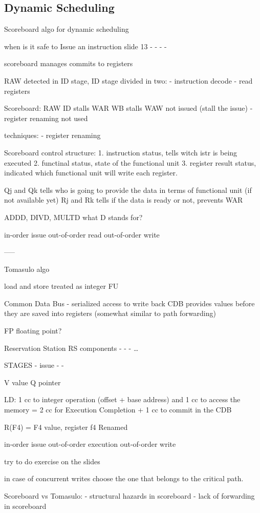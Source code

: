 
\subsection{Dynamic Scheduling}\label{subsec:dynamic-scheduling}

Scoreboard algo for dynamic scheduling

when is it safe to Issue an instruction slide 13
-
-
-
-

scoreboard manages commits to registers

RAW detected in ID stage, ID stage divided in two:
- instruction decode
- read registers

Scoreboard:
RAW ID stalls
WAR WB stalls
WAW not issued (stall the issue) - register renaming not used

techniques:
- register renaming

Scoreboard control structure:
1. instruction status, tells witch istr is being executed
2. functinal status, state of the functional unit
3. register result status, indicated which functional unit will write each register.

Qj and Qk tells who is going to provide the data in terms of functional unit (if not available yet)
Rj and Rk tells if the data is ready or not, prevents WAR

ADDD, DIVD, MULTD what D stands for?

in-order issue
out-of-order read
out-of-order write

-----

Tomasulo algo

load and store treated as integer FU

Common Data Bus - serialized access to write back
CDB provides values before they are saved into registers (somewhat similar to path forwarding)

FP floating point?

Reservation Station RS components
-
-
-
\ldots

STAGES
- issue
-
-

V value
Q pointer

LD: 1 cc to integer operation (offset + base address) and 1 cc to access the memory = 2 cc for Execution Completion + 1 cc to commit in the CDB

R(F4) = F4 value, register f4 Renamed

in-order issue
out-of-order execution
out-of-order write

try to do exercise on the slides

in case of concurrent writes choose the one that belongs to the critical path.

Scoreboard vs Tomasulo:
- structural hazards in scoreboard
- lack of forwarding in scoreboard

